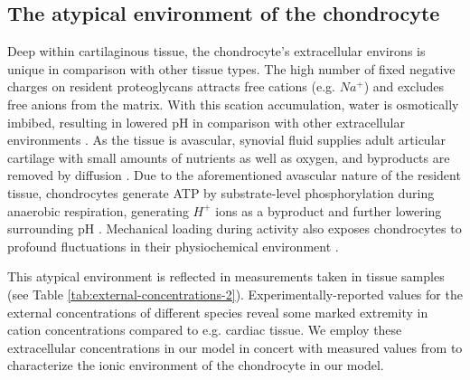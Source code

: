 \subsection*{The atypical environment of the chondrocyte}
\label{sec:chondrocyte-environment}


Deep within cartilaginous tissue, the chondrocyte's extracellular environs is unique in comparison with other tissue types.
The high number of fixed negative charges on resident proteoglycans attracts free cations (e.g. $Na^+$) and excludes free anions from the matrix. 
With this scation accumulation, water is osmotically imbibed, resulting in lowered pH in comparison with other extracellular environments \citep{Wilkinsetal2000, LeeUrban1997}.
As the tissue is avascular, 
synovial fluid supplies adult articular cartilage with small amounts of nutrients as well as oxygen, and byproducts are removed by diffusion \citep{LeeUrban1997, Otte1991}.
Due to the aforementioned avascular nature of the resident tissue, chondrocytes generate ATP by substrate-level phosphorylation during anaerobic respiration, generating $H^+$ ions as a byproduct and further lowering surrounding pH \citep{LeeUrban1997}.
Mechanical loading during activity also exposes chondrocytes to profound fluctuations in their physiochemical environment \citep{Mowetal1999, Urban1994}.


This atypical environment is reflected in measurements taken in tissue samples (see Table \ref{tab:external-concentrations-2}). Experimentally-reported values for the external concentrations of
different species reveal some marked extremity in cation concentrations compared to e.g. cardiac tissue. We employ these extracellular concentrations in our model in concert with
measured values from \cite{Clarketal2011} to characterize the ionic environment of the chondrocyte in our model.

